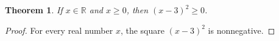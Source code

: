 \documentclass{article}
\newtheorem{theorem}{Theorem}
\begin{document}
\begin{theorem}\label{thm:scope-surplus-hypothesis}
If $x\in\mathbb R$ and $x\ge 0$, then $(x-3)^2\ge 0$.
\end{theorem}
\begin{proof}
For every real number $x$, the square $(x-3)^2$ is nonnegative.
\end{proof}
\end{document}
